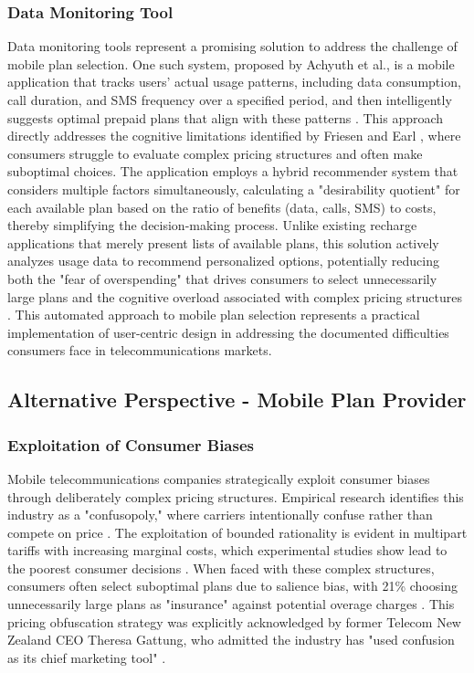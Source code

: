 \documentclass[conference]{IEEEtran}
\begin{document}
\subsubsection{Data Monitoring Tool}
Data monitoring tools represent a promising solution to address the challenge of mobile plan selection. One such system, proposed by Achyuth et al., is a mobile application that tracks users' actual usage patterns, including data consumption, call duration, and SMS frequency over a specified period, and then intelligently suggests optimal prepaid plans that align with these patterns \cite{b6}. This approach directly addresses the cognitive limitations identified by Friesen and Earl \cite{b1}, where consumers struggle to evaluate complex pricing structures and often make suboptimal choices. The application employs a hybrid recommender system that considers multiple factors simultaneously, calculating a "desirability quotient" for each available plan based on the ratio of benefits (data, calls, SMS) to costs, thereby simplifying the decision-making process. Unlike existing recharge applications that merely present lists of available plans, this solution actively analyzes usage data to recommend personalized options, potentially reducing both the "fear of overspending" that drives consumers to select unnecessarily large plans \cite{b3} and the cognitive overload associated with complex pricing structures \cite{b1}. This automated approach to mobile plan selection represents a practical implementation of user-centric design in addressing the documented difficulties consumers face in telecommunications markets.
\subsection{Alternative Perspective - Mobile Plan Provider}
\subsubsection{Exploitation of Consumer Biases}
Mobile telecommunications companies strategically exploit consumer biases through deliberately complex pricing structures. Empirical research identifies this industry as a "confusopoly," where carriers intentionally confuse rather than compete on price \cite{b1}. The exploitation of bounded rationality is evident in multipart tariffs with increasing marginal costs, which experimental studies show lead to the poorest consumer decisions \cite{b1}. When faced with these complex structures, consumers often select suboptimal plans due to salience bias, with 21\% choosing unnecessarily large plans as "insurance" against potential overage charges \cite{b3}. This pricing obfuscation strategy was explicitly acknowledged by former Telecom New Zealand CEO Theresa Gattung, who admitted the industry has "used confusion as its chief marketing tool" \cite{b1}.
\end{document}
